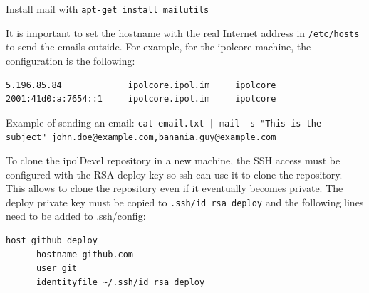 \documentclass[a4paper,12pt]{article}
\begin{document}
Install mail with {\tt apt-get install mailutils}

It is important to set the hostname with the real Internet address in {\tt /etc/hosts} to send the emails outside. For example, for the ipolcore machine, the configuration is the following:

\begin{verbatim}
5.196.85.84             ipolcore.ipol.im     ipolcore
2001:41d0:a:7654::1     ipolcore.ipol.im     ipolcore
\end{verbatim}

Example of sending an email: {\tt cat email.txt | mail -s "This is the subject" john.doe@example.com,banania.guy@example.com}

To clone the ipolDevel repository in a new machine, the SSH access must be configured with the RSA deploy key so ssh can use it to clone the repository. This allows to clone the repository even if it eventually becomes private.
%
The deploy private key must be copied to {\tt .ssh/id\_rsa\_deploy} and the following lines need to be added to .ssh/config:

\begin{verbatim}
host github_deploy
      hostname github.com
      user git
      identityfile ~/.ssh/id_rsa_deploy
\end{verbatim}
\end{document}
